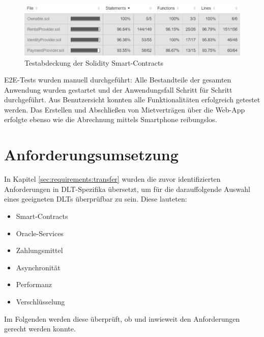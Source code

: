 \begin{figure}[h]
 \centering
 \includegraphics[width=1.0\textwidth]{gfx/coverage.png}
 \caption{Testabdeckung der Solidity Smart-Contracts}
 \label{fig:chapter07:coverage}
\end{figure}

\ac{E2E}-Tests wurden manuell durchgeführt: Alle Bestandteile der gesamten Anwendung wurden gestartet und der Anwendungsfall Schritt für Schritt durchgeführt. Aus Benutzersicht konnten alle Funktionalitäten erfolgreich getestet werden. Das Erstellen und Abschließen von Mietverträgen über die Web-App erfolgte ebenso wie die Abrechnung mittels Smartphone reibungslos.


\section{Anforderungsumsetzung}
\label{sec:implementation:requirements}
In Kapitel \ref{sec:requirements:transfer} wurden die zuvor identifizierten Anforderungen in \ac{DLT}-Spezifika übersetzt, um für die darauffolgende Auswahl eines geeigneten \acp{DLT} überprüfbar zu sein. Diese lauteten:
\begin{itemize}
  \item Smart-Contracts
  \item Oracle-Services
  \item Zahlungsmittel
  \item Asynchronität
  \item Performanz
  \item Verschlüsselung
\end{itemize}
Im Folgenden werden diese überprüft, ob und inwieweit den Anforderungen gerecht werden konnte.

